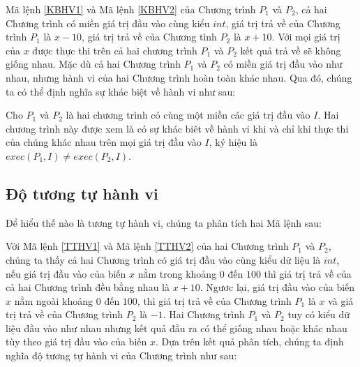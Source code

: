 {\scriptsize \begin{minipage}[t]{0.45\linewidth}
	
\end{minipage}
\hfill\vrule\hfill
\begin{minipage}[t]{0.45\linewidth}
	
\end{minipage}}


Mã lệnh \ref{KBHV1} và Mã lệnh \ref{KBHV2}  của Chương trình $P_{1}$ và $P_{2}$, cả hai Chương trình có miền giá trị đầu vào cùng kiểu $int$, giá trị trả về của Chương trình $P_{1}$ là $x - 10$, giá trị trả về của Chương tình $P_{2}$ là $x + 10$. Với mọi giá trị của $x$ được thực thi trên cả hai chương trình $P_{1}$ và $P_{2}$ kết quả trả về sẽ không giống nhau. Mặc dù cả hai Chương trình $P_{1}$ và $P_{2}$ có miền giá trị đầu vào như nhau, nhưng hành vi của hai Chương trình hoàn toàn khác nhau. Qua đó, chúng ta có thể định nghĩa sự khác biệt về hành vi như sau:

\begin{definition}
Cho $P_{1}$ và $P_{2}$ là hai chương trình có cùng một miền các giá trị đầu vào $I$. Hai chương trình này được xem là có sự khác biêt về hành vi khi và chỉ khi thực thi của chúng khác nhau trên mọi giá trị đầu vào $I$, ký hiệu là $exec(P_{1}, I) \neq exec(P_{2}, I)$.
\end{definition}

\subsection{Độ tương tự hành vi}
Để hiểu thế nào là tương tự hành vi, chúng ta phân tích hai Mã lệnh sau:

{\scriptsize \begin{minipage}[t]{0.45\linewidth}
	
\end{minipage}
\hfill\vrule\hfill
\begin{minipage}[t]{0.45\linewidth}
	
\end{minipage}}

Với Mã lệnh \ref{TTHV1} và Mã lệnh \ref{TTHV2} của hai Chương trình $P_{1}$ và $P_{2}$, chúng ta thấy cả hai Chương trình có giá trị đầu vào cùng kiểu dữ liệu là $int$, nếu giá trị đầu vào của biến $x$ nằm trong khoảng $0$ đến $100$ thì giá trị trả về của cả hai Chương trình đều bằng nhau là $x+10$. Ngươc lại, giá trị đầu vào của biến $x$ nằm ngoài khoảng $0$ đến $100$, thì giá trị trả về của Chương trình $P_{1}$ là $x$ và giá trị trả về của Chương trình $P_{2}$ là $-1$. Hai Chương trình $P_{1}$ và $P_{2}$ tuy có kiểu dữ liệu đầu vào như nhau nhưng kết quả đầu ra có thể giống nhau hoặc khác nhau tùy theo giá trị đầu vào của biến $x$. Dựa trên kết quả phân tích, chúng ta định nghĩa độ tương tự hành vi của Chương trình như sau:

